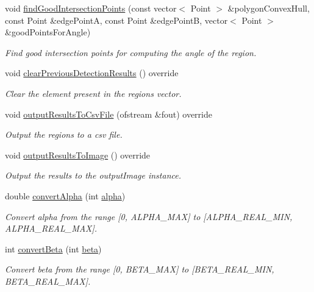 \begin{DoxyCompactItemize}
void \hyperlink{classmultiscale_1_1analysis_1_1RegionDetector_af804b99efa2c9c5adb04c11a5dc5f589}{find\-Good\-Intersection\-Points} (const vector$<$ Point $>$ \&polygon\-Convex\-Hull, const Point \&edge\-Point\-A, const Point \&edge\-Point\-B, vector$<$ Point $>$ \&good\-Points\-For\-Angle)
\begin{DoxyCompactList}\small\item\em Find good intersection points for computing the angle of the region. \end{DoxyCompactList}\item 
void \hyperlink{classmultiscale_1_1analysis_1_1RegionDetector_a4a89f3a28cbb473acc32f22b49d09389}{clear\-Previous\-Detection\-Results} () override
\begin{DoxyCompactList}\small\item\em Clear the element present in the regions vector. \end{DoxyCompactList}\item 
void \hyperlink{classmultiscale_1_1analysis_1_1RegionDetector_a9da92f7959fe324f24301c5bf780fbbd}{output\-Results\-To\-Csv\-File} (ofstream \&fout) override
\begin{DoxyCompactList}\small\item\em Output the regions to a csv file. \end{DoxyCompactList}\item 
void \hyperlink{classmultiscale_1_1analysis_1_1RegionDetector_a23a3ada51983d2a3041f403323e27d06}{output\-Results\-To\-Image} () override
\begin{DoxyCompactList}\small\item\em Output the results to the output\-Image instance. \end{DoxyCompactList}\item 
double \hyperlink{classmultiscale_1_1analysis_1_1RegionDetector_a3de7a4d365c182917b74117a22075ec4}{convert\-Alpha} (int \hyperlink{classmultiscale_1_1analysis_1_1RegionDetector_ab768a3bbfff9835b441a889ab2cb05a6}{alpha})
\begin{DoxyCompactList}\small\item\em Convert alpha from the range \mbox{[}0, A\-L\-P\-H\-A\-\_\-\-M\-A\-X\mbox{]} to \mbox{[}A\-L\-P\-H\-A\-\_\-\-R\-E\-A\-L\-\_\-\-M\-I\-N, A\-L\-P\-H\-A\-\_\-\-R\-E\-A\-L\-\_\-\-M\-A\-X\mbox{]}. \end{DoxyCompactList}\item 
int \hyperlink{classmultiscale_1_1analysis_1_1RegionDetector_a60083ca10a42c25d67e371506cbf5620}{convert\-Beta} (int \hyperlink{classmultiscale_1_1analysis_1_1RegionDetector_a23c831170c2264dd7e59067a1a7d3c8e}{beta})
\begin{DoxyCompactList}\small\item\em Convert beta from the range \mbox{[}0, B\-E\-T\-A\-\_\-\-M\-A\-X\mbox{]} to \mbox{[}B\-E\-T\-A\-\_\-\-R\-E\-A\-L\-\_\-\-M\-I\-N, B\-E\-T\-A\-\_\-\-R\-E\-A\-L\-\_\-\-M\-A\-X\mbox{]}. \end{DoxyCompactList}\end{DoxyCompactItemize}
